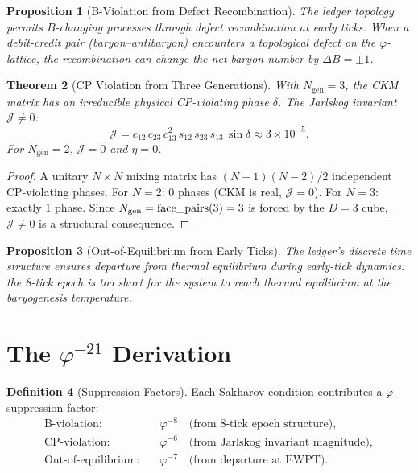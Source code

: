 \documentclass[12pt,a4paper]{article}
\newtheorem{theorem}{Theorem}[section]
\newtheorem{proposition}[theorem]{Proposition}
\theoremstyle{definition}
\newtheorem{definition}[theorem]{Definition}
\theoremstyle{remark}
\begin{document}
\begin{proposition}[B-Violation from Defect Recombination]
\label{thm:b-violation}
The ledger topology permits $B$-changing processes through defect
recombination at early ticks.  When a debit-credit pair
(baryon--antibaryon) encounters a topological defect on the
$\varphi$-lattice, the recombination can change the net baryon
number by $\Delta B = \pm 1$.
\end{proposition}

\begin{theorem}[CP Violation from Three Generations]
\label{thm:cp-violation}
With $N_{\mathrm{gen}} = 3$, the CKM matrix has an
irreducible physical CP-violating phase $\delta$.  The Jarlskog
invariant $\mathcal{J} \neq 0$:
\begin{equation}
  \mathcal{J} = c_{12}\,c_{23}\,c_{13}^2\,s_{12}\,s_{23}\,
  s_{13}\,\sin\delta \approx 3 \times 10^{-5}.
\end{equation}
For $N_{\mathrm{gen}} = 2$, $\mathcal{J} = 0$ and
$\eta = 0$.
\end{theorem}

\begin{proof}
A unitary $N\times N$ mixing matrix has $(N-1)(N-2)/2$
independent CP-violating phases.  For $N=2$: $0$ phases (CKM
is real, $\mathcal{J}=0$).  For $N=3$: exactly 1 phase.
Since $N_{\rm gen}=\mathrm{face\_pairs}(3)=3$ is forced by the
$D=3$ cube, $\mathcal{J}\neq0$ is a structural consequence.
\end{proof}

\begin{proposition}[Out-of-Equilibrium from Early Ticks]
\label{thm:oofe}
The ledger's discrete time structure ensures departure from
thermal equilibrium during early-tick dynamics: the 8-tick epoch
is too short for the system to reach thermal equilibrium at
the baryogenesis temperature.
\end{proposition}

\section{The $\varphi^{-21}$ Derivation}
\label{sec:derivation}

\begin{definition}[Suppression Factors]
Each Sakharov condition contributes a $\varphi$-suppression
factor:
\begin{align}
  \text{B-violation:} \quad &\varphi^{-8} \quad
  \text{(from 8-tick epoch structure)}, \\
  \text{CP-violation:} \quad &\varphi^{-6} \quad
  \text{(from Jarlskog invariant magnitude)}, \\
  \text{Out-of-equilibrium:} \quad &\varphi^{-7} \quad
  \text{(from departure at EWPT)}.
\end{align}
\end{definition}
\end{document}
